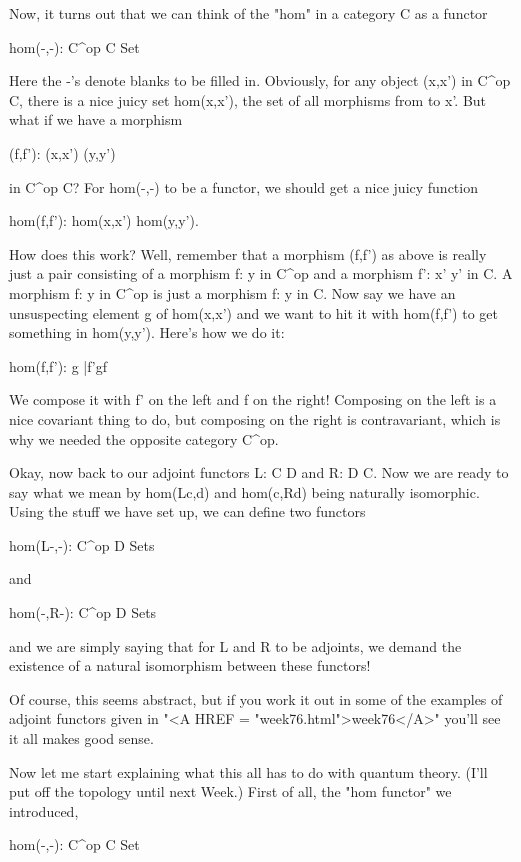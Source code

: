 Now, it turns out that we can think of the "hom" in a category C as a
functor  

                      hom(-,-): C^{op} \times  C \to  Set

Here the -'s denote blanks to be filled in.  Obviously, for any object
(x,x') in C^{op} \times  C, there is a nice juicy set hom(x,x'), the set of
all morphisms from \times  to x'.  But what if we have a morphism 

(f,f'): (x,x') \to  (y,y') 

in C^{op} \times  C?   For hom(-,-) to be a functor, we should get a
nice juicy function

hom(f,f'): hom(x,x') \to  hom(y,y').

How does this work?  Well, remember that a morphism (f,f') as above
is really just a pair consisting of a morphism f: \times  \to  y in C^{op}
and a morphism f': x' \to  y' in C.  A morphism f: \times  \to  y in C^{op} is
just a morphism f: y \to  \times  in C.  Now say we have an unsuspecting
element g of hom(x,x') and we want to hit it with hom(f,f') to get
something in hom(y,y').  Here's how we do it:

hom(f,f'): g |\to  f'gf

We compose it with f' on the left and f on the right!  Composing on
the left is a nice covariant thing to do, but composing on the right
is contravariant, which is why we needed the opposite category C^{op}.

Okay, now back to our adjoint functors L: C \to  D and R: D \to  C.
Now we are ready to say what we mean by hom(Lc,d) and hom(c,Rd) being
naturally isomorphic.  Using the stuff we have set up, we can define
two functors

hom(L-,-): C^{op} \times  D \to  Sets

and

hom(-,R-): C^{op} \times  D \to  Sets

and we are simply saying that for L and R to be adjoints, we demand
the existence of a natural isomorphism between these functors!

Of course, this seems abstract, but if you work it out in some of
the examples of adjoint functors given in "<A HREF = "week76.html">week76</A>" you'll see it all
makes good sense.

Now let me start explaining what this all has to do with quantum theory.
(I'll put off the topology until next Week.)  First of all, the "hom functor"
we introduced,

hom(-,-): C^{op} \times  C \to  Set

